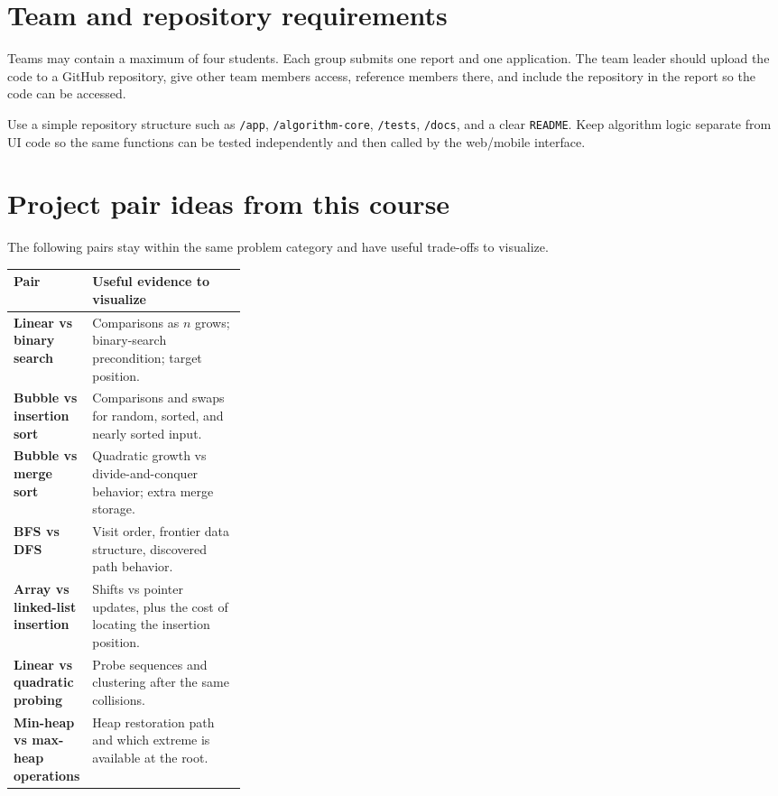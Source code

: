 \section{Team and repository requirements}

\begin{projectrequirement}
Teams may contain a maximum of four students. Each group submits one report and one application. The team leader should upload the code to a GitHub repository, give other team members access, reference members there, and include the repository in the report so the code can be accessed.
\end{projectrequirement}

\begin{recommendedworkflow}
Use a simple repository structure such as \texttt{/app}, \texttt{/algorithm-core}, \texttt{/tests}, \texttt{/docs}, and a clear \texttt{README}. Keep algorithm logic separate from UI code so the same functions can be tested independently and then called by the web/mobile interface.
\end{recommendedworkflow}

\section{Project pair ideas from this course}

The following pairs stay within the same problem category and have useful trade-offs to visualize.

\begin{mltable}
\begin{tabularx}{\linewidth}{@{}>{\bfseries\leavevmode\color{ADSNavy}}p{0.30\linewidth}X@{}}
\toprule
\rowcolor{ADSPaleBlue!92}
Pair & Useful evidence to visualize \\
\midrule
Linear vs binary search & Comparisons as $n$ grows; binary-search precondition; target position. \\
Bubble vs insertion sort & Comparisons and swaps for random, sorted, and nearly sorted input. \\
Bubble vs merge sort & Quadratic growth vs divide-and-conquer behavior; extra merge storage. \\
BFS vs DFS & Visit order, frontier data structure, discovered path behavior. \\
Array vs linked-list insertion & Shifts vs pointer updates, plus the cost of locating the insertion position. \\
Linear vs quadratic probing & Probe sequences and clustering after the same collisions. \\
Min-heap vs max-heap operations & Heap restoration path and which extreme is available at the root. \\
\bottomrule
\end{tabularx}
\end{mltable}

